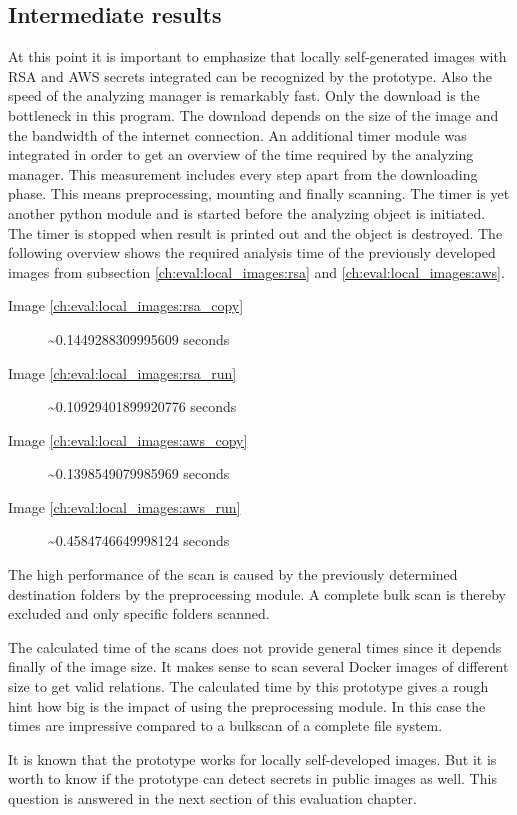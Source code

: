 \subsection{Intermediate results}
At this point it is important to emphasize that locally self-generated images with RSA and AWS secrets integrated can be recognized by the prototype.
Also the speed of the analyzing manager is remarkably fast. 
Only the download is the bottleneck in this program. The download depends on the size of the image and the bandwidth of the internet connection.
An additional timer module was integrated in order to get an overview of the time required by the analyzing manager.
This measurement includes every step apart from the downloading phase. This means preprocessing, mounting and finally scanning.
The timer is yet another python module and is started before the analyzing object is initiated. 
The timer is stopped when result is printed out and the object is destroyed.
The following overview shows the required analysis time of the previously developed images from subsection \ref{ch:eval:local_images:rsa} and \ref{ch:eval:local_images:aws}. 
\begin{description}
\item [Image \ref{ch:eval:local_images:rsa_copy}] \textasciitilde 0.1449288309995609 seconds
\item [Image \ref{ch:eval:local_images:rsa_run}] \textasciitilde 0.10929401899920776 seconds
\item [Image \ref{ch:eval:local_images:aws_copy}] \textasciitilde 0.1398549079985969 seconds
\item [Image \ref{ch:eval:local_images:aws_run}] \textasciitilde 0.4584746649998124 seconds
\end{description}
The high performance of the scan is caused by the previously determined destination folders by the preprocessing module.
A complete bulk scan is thereby excluded and only specific folders scanned.

The calculated time of the scans does not provide general times since it depends finally of the image size. 
It makes sense to scan several Docker images of different size to get valid relations.
The calculated time by this prototype gives a rough hint how big is the impact of using the preprocessing module.
In this case the times are impressive compared to a bulkscan of a complete file system.

It is known that the prototype works for locally self-developed images. But it is worth to know if the prototype can detect secrets in public images as well.
This question is answered in the next section of this evaluation chapter.